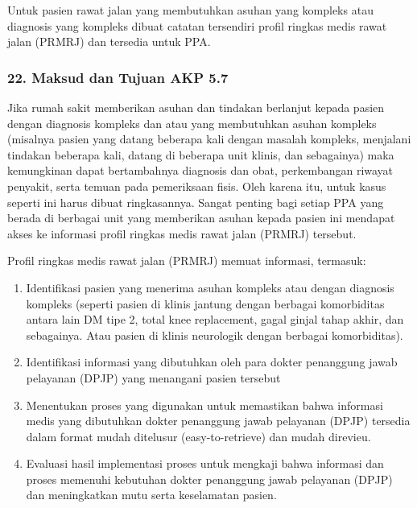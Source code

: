 \documentclass[
]{book}
\providecommand{\tightlist}{%
  \setlength{\itemsep}{0pt}\setlength{\parskip}{0pt}}
\begin{document}
Untuk pasien rawat jalan yang membutuhkan asuhan yang kompleks atau diagnosis yang kompleks dibuat catatan tersendiri profil ringkas medis rawat jalan (PRMRJ) dan tersedia untuk PPA.

\hypertarget{maksud-dan-tujuan-akp-5.7}{%
\subsubsection*{22. Maksud dan Tujuan AKP 5.7}\label{maksud-dan-tujuan-akp-5.7}}

Jika rumah sakit memberikan asuhan dan tindakan berlanjut kepada pasien dengan diagnosis kompleks dan atau yang membutuhkan asuhan kompleks (misalnya pasien yang datang beberapa kali dengan masalah kompleks, menjalani tindakan beberapa kali, datang di beberapa unit klinis, dan sebagainya) maka kemungkinan dapat bertambahnya diagnosis dan obat, perkembangan riwayat penyakit, serta temuan pada pemeriksaan fisis. Oleh karena itu, untuk kasus seperti ini harus dibuat ringkasannya. Sangat penting bagi setiap PPA yang berada di berbagai unit yang memberikan asuhan kepada pasien ini mendapat akses ke informasi profil ringkas medis rawat jalan (PRMRJ) tersebut.

Profil ringkas medis rawat jalan (PRMRJ) memuat informasi, termasuk:

\begin{enumerate}
\def\labelenumi{\alph{enumi}.}
\tightlist
\item
  Identifikasi pasien yang menerima asuhan kompleks atau dengan diagnosis kompleks (seperti pasien di klinis jantung dengan berbagai komorbiditas antara lain DM tipe 2, total knee replacement, gagal ginjal tahap akhir, dan sebagainya. Atau pasien di klinis neurologik dengan berbagai komorbiditas).
\item
  Identifikasi informasi yang dibutuhkan oleh para dokter penanggung jawab pelayanan (DPJP) yang menangani pasien tersebut
\item
  Menentukan proses yang digunakan untuk memastikan bahwa informasi medis yang dibutuhkan dokter penanggung jawab pelayanan (DPJP) tersedia dalam format mudah ditelusur (easy-to-retrieve) dan mudah direvieu.
\item
  Evaluasi hasil implementasi proses untuk mengkaji bahwa informasi dan proses memenuhi kebutuhan dokter penanggung jawab pelayanan (DPJP) dan meningkatkan mutu serta keselamatan pasien.
\end{enumerate}
\end{document}
